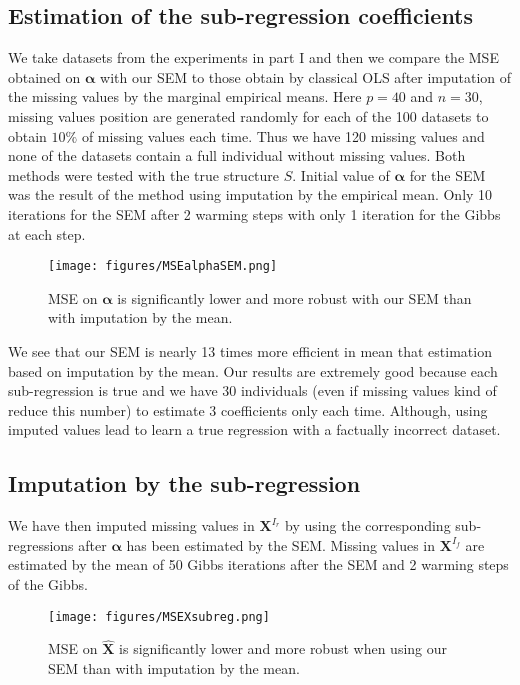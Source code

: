 \documentclass[12pt,a4paper]{report}
\begin{document}
		\subsection{Estimation of the sub-regression coefficients}
			We take datasets from the experiments in part I and then we compare the MSE obtained on $\boldsymbol{\alpha}$ with our SEM to those obtain by classical OLS after imputation of the missing values by the marginal empirical means. Here $p=40$ and $n=30$, missing values position are generated randomly for each of the 100 datasets to obtain $10 \%$ of missing values each time. Thus we have 120 missing values and none of the datasets contain a full individual without missing values.
Both methods were tested with the true structure $S$. Initial value of $\boldsymbol{\alpha}$ for the SEM was the result of the method using imputation by the empirical mean. Only 10 iterations for the SEM after 2 warming steps with only 1 iteration for the Gibbs at each step.

\begin{figure}[h!]
	\centering
	\texttt{[image: figures/MSEalphaSEM.png]} 
	\caption{MSE on $\boldsymbol{\alpha}$ is significantly lower and more robust with our SEM than with imputation by the mean.}\label{MSEalphaSEM}
\end{figure}

	We see that our SEM is nearly 13 times more efficient in mean that estimation based on imputation by the mean. Our results are extremely good because each sub-regression is true and we have 30 individuals (even if missing values kind of reduce this number) to estimate 3 coefficients only each time. Although, using imputed values lead to learn a true regression with a factually incorrect dataset. 

		
			\subsection{Imputation by the sub-regression}
			We have then imputed missing values in $\boldsymbol{X}^{I_r}$  by using the corresponding sub-regressions after $\boldsymbol{\alpha}$ has been estimated  by the SEM.
			Missing values in $\boldsymbol{X}^{I_f}$ are estimated by the mean of 50 Gibbs iterations after the SEM and 2 warming steps of the Gibbs.
			\begin{figure}[h!]
	\centering
	\texttt{[image: figures/MSEXsubreg.png]} 
	\caption{MSE on $\hat{\boldsymbol{X}}$ is significantly lower and more robust when using our SEM than with imputation by the mean.}\label{MSEXsubreg}
\end{figure}
\end{document}

